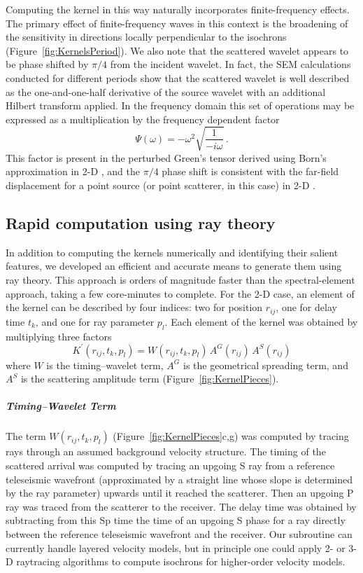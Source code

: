 \documentclass[referee]{gji}
\begin{document}
Computing the kernel in this way naturally incorporates finite-frequency effects.  The primary effect of finite-frequency waves in this context is the broadening of the sensitivity in directions locally perpendicular to the isochrons (Figure~\ref{fig:KernelsPeriod}).  We also note that the scattered wavelet appears to be phase shifted by $\pi/4$ from the incident wavelet.  In fact, the SEM calculations conducted for different periods show that the scattered wavelet is well described as the one-and-one-half derivative of the source wavelet with an additional Hilbert transform applied.  In the frequency domain this set of operations may be expressed as a multiplication by the frequency dependent factor
\begin{equation}
\label{eqn:FrequencyFactor}
\Psi(\omega) = -\omega^2 \sqrt{\frac{1}{-i\omega}} \, .
\end{equation}
This factor is present in the perturbed Green's tensor derived using Born's approximation in 2-D \citep{Bostock1999}, and the $\pi/4$ phase shift is consistent with the far-field displacement for a point source (or point scatterer, in this case) in 2-D \citep[e.g.,][]{Frazer1980, Hudson1980}.

\subsection{Rapid computation using ray theory}

In addition to computing the kernels numerically and identifying their salient features, we developed an efficient and accurate means to generate them using ray theory. This approach is orders of magnitude faster than the spectral-element approach, taking a few core-minutes to complete.  For the 2-D case, an element of the kernel can be described by four indices: two for position $r_{ij}$, one for delay time $t_k$, and one for ray parameter $p_l$.  Each element of the kernel was obtained by multiplying three factors
\begin{equation}
\label{eqn:KernelRayTheory}
K^\prime (r_{ij},t_k,p_l) = W(r_{ij},t_k,p_l) \, A^G(r_{ij}) \, A^S(r_{ij})
\end{equation}
where $W$ is the timing--wavelet term, $A^G$ is the geometrical spreading term, and $A^S$ is the scattering amplitude term (Figure~\ref{fig:KernelPieces}).

\subparagraph{Timing--Wavelet Term}
The term $W(r_{ij},t_k,p_l)$ (Figure~\ref{fig:KernelPieces}c,g) was computed by tracing rays through an assumed background velocity structure. The timing of the scattered arrival was computed by tracing an upgoing S ray from a reference teleseismic wavefront (approximated by a straight line whose slope is determined by the ray parameter) upwards until it reached the scatterer.  Then an upgoing P ray was traced from the scatterer to the receiver.  The delay time was obtained by subtracting from this Sp time the time of an upgoing S phase for a ray directly between the reference teleseismic wavefront and the receiver.  Our subroutine can currently handle layered velocity models, but in principle one could apply 2- or 3-D raytracing algorithms to compute isochrons for higher-order velocity models.
\end{document}
